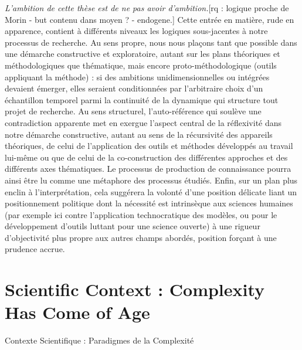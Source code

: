 {
\emph{L'ambition de cette thèse est de ne pas avoir d'ambition.}[rq : logique proche de Morin - but contenu dans moyen ? - endogene.]
 Cette entrée en matière, rude en apparence, contient à différents niveaux les logiques sous-jacentes à notre processus de recherche. Au sens propre, nous nous plaçons tant que possible dans une démarche constructive et exploratoire, autant sur les plans théoriques et méthodologiques que thématique, mais encore proto-méthodologique (outils appliquant la méthode) : si des ambitions unidimensionnelles ou intégrées devaient émerger, elles seraient conditionnées par l'arbitraire choix d'un échantillon temporel parmi la continuité de la dynamique qui structure tout projet de recherche. Au sens structurel, l'auto-référence qui soulève une contradiction apparente met en exergue l'aspect central de la réflexivité dans notre démarche constructive, autant au sens de la récursivité des appareils théoriques, de celui de l'application des outils et méthodes développés au travail lui-même ou que de celui de la co-construction des différentes approches et des différents axes thématiques. Le processus de production de connaissance pourra ainsi être lu comme une métaphore des processus étudiés. Enfin, sur un plan plus enclin à l'interprétation, cela suggérera la volonté d'une position délicate liant un positionnement politique dont la nécessité est intrinsèque aux sciences humaines (par exemple ici contre l'application technocratique des modèles, ou pour le développement d'outils luttant pour une science ouverte) à une rigueur d'objectivité plus propre aux autres champs abordés, position forçant à une prudence accrue.
}




\section*{Scientific Context : Complexity Has Come of Age}{Contexte Scientifique : Paradigmes de la Complexité}


